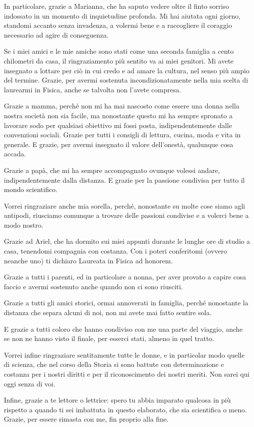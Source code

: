 In particolare, grazie a Marianna, che ha saputo vedere oltre il finto sorriso indossato in un momento di inquietudine profonda. Mi hai aiutata ogni giorno, standomi accanto senza invadenza, a volermi bene e a raccogliere il coraggio necessario ad agire di conseguenza. 
\medskip

Se i miei amici e le mie amiche sono stati come una seconda famiglia a cento chilometri da casa, il ringraziamento più sentito va ai miei genitori. Mi avete insegnato a lottare per ciò in cui credo e ad amare la cultura, nel senso più ampio del termine. Grazie, per avermi sostenuta incondizionatamente nella mia scelta di laurearmi in Fisica, anche se talvolta non l’avete compresa. 

Grazie a mamma, perché non mi ha mai nascosto come essere una donna nella nostra società non sia facile, ma nonostante questo mi ha sempre spronato a lavorare sodo per qualsiasi obiettivo mi fossi posta, indipendentemente dalle convenzioni sociali. Grazie per tutti i consigli di lettura, cucina, moda e vita in generale. E grazie, per avermi insegnato il valore dell’onestà, qualunque cosa accada. 

Grazie a papà, che mi ha sempre accompagnato ovunque volessi andare, indipendentemente dalla distanza. E grazie per la passione condivisa per tutto il mondo scientifico. 

Vorrei ringraziare anche mia sorella, perché, nonostante su molte cose siamo agli antipodi, riusciamo comunque a trovare delle passioni condivise e a volerci bene a modo nostro. 

Grazie ad Ariel, che ha dormito sui miei appunti durante le lunghe ore di studio a casa, tenendomi compagnia con costanza. Con i poteri conferitomi (ovvero neanche uno) ti dichiaro Laureata in Fisica ad honorem. 

Grazie a tutti i parenti, ed in particolare a nonna, per aver provato a capire cosa faccio e avermi sostenuto anche quando non ci sono riusciti. 

Grazie a tutti gli amici storici, ormai annoverati in famiglia, perché nonostante la distanza che separa alcuni di noi, non mi avete mai fatto sentire sola.

E grazie a tutti coloro che hanno condiviso con me una parte del viaggio, anche se non ne hanno visto il finale, per esserci stati, almeno in quel tratto. 
\medskip

Vorrei infine ringraziare sentitamente tutte le donne, e in particolar modo quelle di scienza, che nel corso della Storia si sono battute con determinazione e costanza per i nostri diritti e per il riconoscimento dei nostri meriti. Non sarei qui oggi senza di voi.
\medskip 

Infine, grazie a te lettore o lettrice: spero tu abbia imparato qualcosa in più rispetto a quando ti sei imbattuta in questo elaborato, che sia scientifica o meno. Grazie, per essere rimasta con me, fin proprio alla fine.

